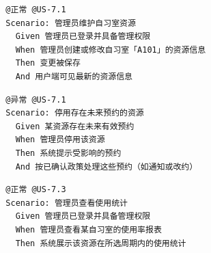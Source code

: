 \documentclass[11pt,a4paper]{article}
\begin{document}
\begin{framed}
\small
\begin{verbatim}
  @正常 @US-7.1
  Scenario: 管理员维护自习室资源
    Given 管理员已登录并具备管理权限
    When 管理员创建或修改自习室「A101」的资源信息
    Then 变更被保存
    And 用户端可见最新的资源信息
\end{verbatim}
\end{framed}

\begin{framed}
\small
\begin{verbatim}
  @异常 @US-7.1
  Scenario: 停用存在未来预约的资源
    Given 某资源存在未来有效预约
    When 管理员停用该资源
    Then 系统提示受影响的预约
    And 按已确认政策处理这些预约（如通知或改约）
\end{verbatim}
\end{framed}

\begin{framed}
\small
\begin{verbatim}
  @正常 @US-7.3
  Scenario: 管理员查看使用统计
    Given 管理员已登录并具备管理权限
    When 管理员查看某自习室的使用率报表
    Then 系统展示该资源在所选周期内的使用统计
\end{verbatim}
\end{framed}
\end{document}
